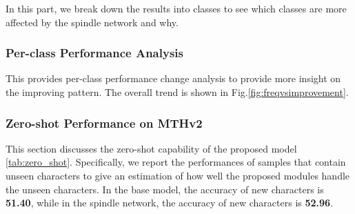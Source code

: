 In this part, we break down the results into classes to see which classes are more affected by the spindle network and why. 
\subsubsection{Per-class Performance Analysis}


This provides per-class performance change analysis to provide more insight on the improving pattern. 
The overall trend is shown in Fig.\ref{fig:freqvsimprovement}. 



\subsubsection{Zero-shot Performance on MTHv2}


This section discusses the zero-shot capability of the proposed model \ref{tab:zero_shot}. Specifically, we report the performances of samples that contain unseen characters to give an estimation of how well the proposed modules handle the unseen characters. In the base model, the accuracy of new characters is \textbf{51.40}, while in the spindle network, the accuracy of new characters is \textbf{52.96}. 


